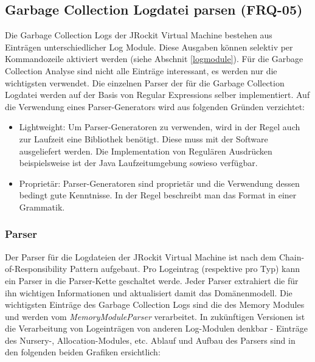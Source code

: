 \subsection{Garbage Collection Logdatei parsen (FRQ-05)}
Die Garbage Collection Logs der JRockit Virtual Machine bestehen aus Einträgen unterschiedlicher Log Module. Diese Ausgaben können selektiv per Kommandozeile aktiviert werden (siehe Abschnit \ref{logmodule}). Für die Garbage Collection Analyse sind nicht alle Einträge interessant, es werden nur die wichtigsten verwendet. Die einzelnen Parser der für die Garbage Collection Logdatei werden auf der Basis von Regular Expressions selber implementiert. Auf die Verwendung eines Parser-Generators wird aus folgenden Gründen verzichtet:
\begin{itemize}
	\item Lightweight: Um Parser-Generatoren zu verwenden, wird in der Regel auch zur Laufzeit eine Bibliothek benötigt. Diese muss mit der Software ausgeliefert werden. Die Implementation von Regulären Ausdrücken beispielsweise ist der Java Laufzeitumgebung sowieso verfügbar.
	\item Proprietär: Parser-Generatoren sind proprietär und die Verwendung dessen bedingt gute Kenntnisse. In der Regel beschreibt man das Format in einer Grammatik.
\end{itemize}

\subsubsection{Parser}
Der Parser für die Logdateien der JRockit Virtual Machine ist nach dem Chain-of-Responsibility Pattern\cite{wiki:chainOfResponsibilityPattern} aufgebaut. Pro Logeintrag (respektive pro Typ) kann ein Parser in die Parser-Kette geschaltet werde. Jeder Parser extrahiert die für ihn wichtigen Informationen und aktualisiert damit das Domänenmodell. Die wichtigsten Einträge des Garbage Collection Logs sind die des Memory Modules und werden vom \textit{MemoryModuleParser} verarbeitet. In zukünftigen Versionen ist die Verarbeitung von Logeinträgen von anderen Log-Modulen denkbar - Einträge des Nursery-, Allocation-Modules, etc. Ablauf und Aufbau des Parsers sind in den folgenden beiden Grafiken ersichtlich:

